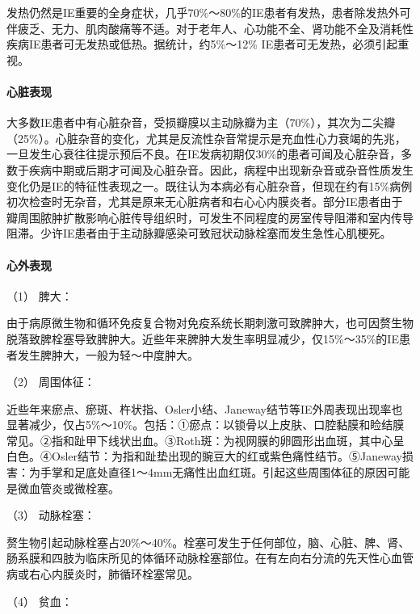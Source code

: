 发热仍然是IE重要的全身症状，几乎70\%～80\%的IE患者有发热，患者除发热外可伴疲乏、无力、肌肉酸痛等不适。对于老年人、心功能不全、肾功能不全及消耗性疾病IE患者可无发热或低热。据统计，约5\%～12\%
IE患者可无发热，必须引起重视。

\paragraph{心脏表现}

大多数IE患者中有心脏杂音，受损瓣膜以主动脉瓣为主（70\%），其次为二尖瓣（25\%）。心脏杂音的变化，尤其是反流性杂音常提示是充血性心力衰竭的先兆，一旦发生心衰往往提示预后不良。在IE发病初期仅30\%的患者可闻及心脏杂音，多数于疾病中期或后期才可闻及心脏杂音。因此，病程中出现新杂音或杂音性质发生变化仍是IE的特征性表现之一。既往认为本病必有心脏杂音，但现在约有15\%病例初次检查时无杂音，尤其是原来无心脏病者和右心心内膜炎者。部分IE患者由于瓣周围脓肿扩散影响心脏传导组织时，可发生不同程度的房室传导阻滞和室内传导阻滞。少许IE患者由于主动脉瓣感染可致冠状动脉栓塞而发生急性心肌梗死。

\paragraph{心外表现}

\hypertarget{text00300.htmlux5cux23CHP10-3-2-2-4-1}{}
（1） 脾大：

由于病原微生物和循环免疫复合物对免疫系统长期刺激可致脾肿大，也可因赘生物脱落致脾栓塞导致脾肿大。近些年来脾肿大发生率明显减少，仅15\%～35\%的IE患者发生脾肿大，一般为轻～中度肿大。

\hypertarget{text00300.htmlux5cux23CHP10-3-2-2-4-2}{}
（2） 周围体征：

近些年来瘀点、瘀斑、杵状指、Osler小结、Janeway结节等IE外周表现出现率也显著减少，仅占5\%～10\%。包括：①瘀点：以锁骨以上皮肤、口腔黏膜和睑结膜常见。②指和趾甲下线状出血。③Roth斑：为视网膜的卵圆形出血斑，其中心呈白色。④Osler结节：为指和趾垫出现的豌豆大的红或紫色痛性结节。⑤Janeway损害：为手掌和足底处直径1～4mm无痛性出血红斑。引起这些周围体征的原因可能是微血管炎或微栓塞。

\hypertarget{text00300.htmlux5cux23CHP10-3-2-2-4-3}{}
（3） 动脉栓塞：

赘生物引起动脉栓塞占20\%～40\%。栓塞可发生于任何部位，脑、心脏、脾、肾、肠系膜和四肢为临床所见的体循环动脉栓塞部位。在有左向右分流的先天性心血管病或右心内膜炎时，肺循环栓塞常见。

\hypertarget{text00300.htmlux5cux23CHP10-3-2-2-4-4}{}
（4） 贫血：

